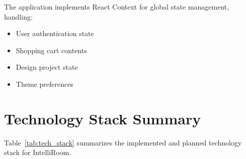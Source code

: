 The application implements React Context for global state management, handling:
\begin{itemize}
    \item User authentication state
    \item Shopping cart contents
    \item Design project state
    \item Theme preferences
\end{itemize}

\section{Technology Stack Summary}
\label{sec:tech_stack}

Table~\ref{tab:tech_stack} summarizes the implemented and planned technology stack for IntelliRoom.


